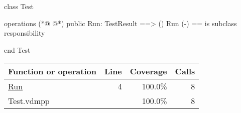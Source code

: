 \begin{vdmpp}[breaklines=true]
class Test

operations
(*@
\label{Run:4}
@*)
  public Run: TestResult ==> ()
  Run (-) == is subclass responsibility

end Test
\end{vdmpp}
\bigskip
\begin{longtable}{|l|r|r|r|}
\hline
Function or operation & Line & Coverage & Calls \\
\hline
\hline
\hyperref[Run:4]{Run} & 4&100.0\% & 8 \\
\hline
\hline
Test.vdmpp & & 100.0\% & 8 \\
\hline
\end{longtable}

